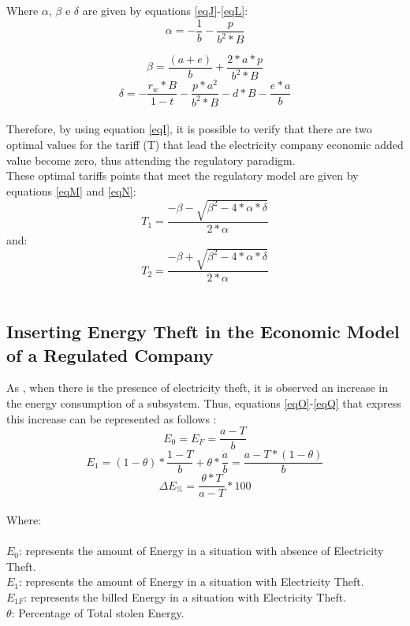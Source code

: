 \documentclass[preprint,12pt]{elsarticle}
\begin{document}
Where $ \alpha$, $\beta$ e $\delta $ are given by equations \ref{eqJ}-\ref{eqL}:\\
\begin{equation}
\alpha = -\frac{1}{b} - \frac{p}{b^2*B}
\label{eqJ}
\end{equation}

\begin{equation}
\beta = \frac{(a+e)}{b} + \frac{2*a*p}{b^2*B}
\label{eqK}
\end{equation}
\begin{equation}
\delta = -\frac{r_w *B}{1-t}- \frac{p*a^2}{b^2*B}-d*B- \frac{e*a}{b}
\label{eqL}
\end{equation}\\
Therefore, by using equation \ref{eqI}, it is possible to verify that there are two optimal values for the tariff (T) that lead the electricity company economic added value become zero, thus attending the regulatory paradigm. \\
These optimal tariffs points that meet the regulatory model are given by equations \ref{eqM} and \ref{eqN}:\\
\begin{equation}
T_1 = \frac{-\beta - \sqrt{\beta ^2 - 4* \alpha *\delta}}{2*\alpha}
\label{eqM}
\end{equation}
and:
\begin{equation}
T_2 = \frac{-\beta + \sqrt{\beta ^2 - 4* \alpha *\delta}}{2*\alpha}
\label{eqN}
\end{equation}\\

\subsection{Inserting Energy Theft in the Economic Model of a Regulated Company}
\label{SS:2-3}

As \citet{Arango2016ImpactQuality}, when there is the presence of electricity theft, it is observed an increase in the energy consumption of a subsystem. Thus, equations \ref{eqO}-\ref{eqQ} that express this increase can be represented as follows :\\
\begin{equation}
E_0 = E_F = \frac{a-T}{b}
\label{eqO}
\end{equation}
\begin{equation}
E_1 = (1-\theta)* \frac{1-T}{b}+\theta* \frac{a}{b} = \frac{a - T*(1-\theta)}{b}
\label{eqP}
\end{equation}
\begin{equation}
\Delta E_\% = \frac{\theta*T}{a-T} * 100
\label{eqQ}
\end{equation}\\
Where:\\\\
$E_0$: represents the amount of Energy in a situation with absence of Electricity Theft.\\
$E_1$: represents the amount of Energy in a situation with Electricity Theft.\\
$E_{1F}$: represents the billed Energy in a situation with Electricity Theft.\\
$\theta$: Percentage of Total stolen Energy.\\
\end{document}

